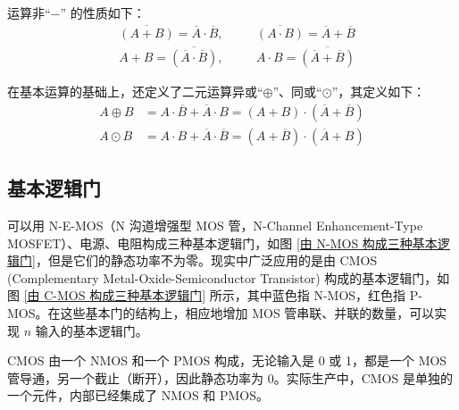 \documentclass[UTF8]{report}
\theoremstyle{MyLineTheoremStyle} %
\theoremstyle{MyBlockTheoremStyle} %
\theoremstyle{MySubsubsectionStyle} %
\begin{document}
运算非“$-$” 的性质如下：
\begin{equation}
\begin{aligned}
    &\overline{(A + B)} = \overline{A} \cdot \overline{B} ,\quad &&\overline{(A \cdot B)} = \overline{A} + \overline{B} \\
    &A + B = \overline{(\overline{A} \cdot \overline{B})},\quad && A \cdot B = \overline{(\overline{A} + \overline{B})}
\end{aligned}
\end{equation}

在基本运算的基础上，还定义了二元运算异或“$\oplus$”、同或“$\odot$”，其定义如下：
\begin{equation}
\begin{aligned}
    A \oplus B &= A \cdot \overline{B} + \overline{A} \cdot B = (A + B) \cdot (\overline{A} + \overline{B})\\
    A \odot B &= A \cdot B  + \overline{A} \cdot \overline{B} = (A + \overline{B}) \cdot (\overline{A} + B)
\end{aligned}
\end{equation}


\subsection{基本逻辑门}

可以用 N-E-MOS（N 沟道增强型 MOS 管，N-Channel Enhancement-Type MOSFET）、电源、电阻构成三种基本逻辑门，如图 \ref{由 N-MOS 构成三种基本逻辑门}，但是它们的静态功率不为零。现实中广泛应用的是由 CMOS (Complementary Metal-Oxide-Semiconductor Transistor) 构成的基本逻辑门，如图 \ref{由 C-MOS 构成三种基本逻辑门} 所示，其中蓝色指 N-MOS，红色指 P-MOS。在这些基本门的结构上，相应地增加 MOS 管串联、并联的数量，可以实现 $n$ 输入的基本逻辑门。

CMOS 由一个 NMOS 和一个 PMOS 构成，无论输入是 0 或 1，都是一个 MOS 管导通，另一个截止（断开），因此静态功率为 0。实际生产中，CMOS 是单独的一个元件，内部已经集成了 NMOS 和 PMOS。

\end{document}
